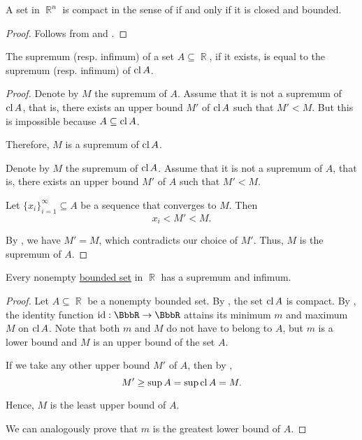 \begin{theorem}\label{thm:heine_borel}
  A set in \( \BbbR^n \) is compact in the sense of  if and only if it is closed and bounded.
\end{theorem}
\begin{proof}
  Follows from  and .
\end{proof}

\begin{proposition}\label{thm:real_supremum_of_closure}
  The supremum (resp. infimum) of a set \( A \subseteq \BbbR \), if it exists, is equal to the supremum (resp. infimum) of \( \operatorname{cl} A \).
\end{proposition}
\begin{proof}
  \SufficiencySubProof Denote by \( M \) the supremum of \( A \). Assume that it is not a supremum of \( \operatorname{cl} A \), that is, there exists an upper bound \( M' \) of \( \operatorname{cl} A \) such that \( M' < M \). But this is impossible because \( A \subseteq \operatorname{cl} A \).

  Therefore, \( M \) is a supremum of \( \operatorname{cl} A \).

  \NecessitySubProof Denote by \( M \) the supremum of \( \operatorname{cl} A \). Assume that it is not a supremum of \( A \), that is, there exists an upper bound \( M' \) of \( A \) such that \( M' < M \).

  Let \( \{ x_i \}_{i=1}^\infty \subseteq A \) be a sequence that converges to \( M \). Then
  \begin{equation*}
    x_i < M' < M.
  \end{equation*}

  By , we have \( M' = M \), which contradicts our choice of \( M' \). Thus, \( M \) is the supremum of \( A \).
\end{proof}

\begin{proposition}\label{thm:real_bounded_set_has_supremum}
  Every nonempty \hyperref[def:metric_space/bounded_set]{bounded set} in \( \BbbR \) has a supremum and infimum.
\end{proposition}
\begin{proof}
  Let \( A \subseteq \BbbR \) be a nonempty bounded set. By , the set \( \operatorname{cl} A \) is compact. By , the identity function \( \id: \BbbR \to \BbbR \) attains its minimum \( m \) and maximum \( M \) on \( \operatorname{cl} A \). Note that both \( m \) and \( M \) do not have to belong to \( A \), but \( m \) is a lower bound and \( M \) is an upper bound of the set \( A \).

  If we take any other upper bound \( M' \) of \( A \), then by ,
  \begin{equation*}
    M' \geq \sup A = \sup \operatorname{cl} A = M.
  \end{equation*}

  Hence, \( M \) is the least upper bound of \( A \).

  We can analogously prove that \( m \) is the greatest lower bound of \( A \).
\end{proof}
